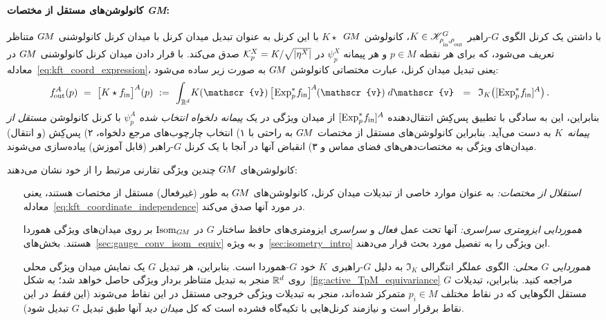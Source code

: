 \paragraph{کانولوشن‌های مستقل از مختصات \textit{GM}:}

با داشتن یک کرنل الگوی $G$-راهبر $K\in\KG$، کانولوشن $G\mkern-1.4muM$~$K\star$ با این کرنل به عنوان تبدیل میدان کرنل با میدان کرنل کانولوشنی $G\mkern-1.4muM$ متناظر تعریف می‌شود، که برای هر نقطه $p\in M$ و هر پیمانه $\psi_p^X$ در $\mathcal{K}_p^X = K / \sqrt{|\eta^X|}$ صدق می‌کند.
با قرار دادن میدان کرنل کانولوشنی $G\mkern-1.4muM$ در معادله~\eqref{eq:kft_coord_expression}، یعنی تبدیل میدان کرنل، عبارت مختصاتی کانولوشن $G\mkern-1.4muM$ به صورت زیر ساده می‌شود:
\begin{align}\label{eq:gauge_conv_coord_expression}
	\fout^A(p)
	\ =\ 
	\big[ K \star \fin \big]^A(p)
	\ :=&\,\ 
	\int_{\R^d} \!
	K(\mathscr{v}) \,
	\big[\mkern-2mu \Expspfin\big]^{\mkern-2mu A} \mkern-1mu(\mathscr{v})
	\; d\mathscr{v}
	\ \ =\,\ \mathfrak{I}_K \big( [\Expspfin]^A \big)
	\,.
\end{align}
بنابراین، این به سادگی با تطبیق پس‌کِش انتقال‌دهنده $[\operatorname{Exp}^*_p\mkern-2mu f_\textup{\;\!\!in}]^A$ از میدان ویژگی در یک \emph{پیمانه دلخواه انتخاب شده} $\psi_p^A$ با کرنل کانولوشن \emph{مستقل از پیمانه}~$K$ به دست می‌آید.
بنابراین کانولوشن‌های مستقل از مختصات $G\mkern-1.4muM$ به راحتی با
۱) انتخاب چارچوب‌های مرجع دلخواه،
۲) پس‌کِش (و انتقال) میدان‌های ویژگی به مختصات‌دهی‌های فضای مماس و
۳) انقباض آنها در آنجا با یک کرنل $G$-راهبر (قابل آموزش) پیاده‌سازی می‌شوند.

کانولوشن‌های $G\mkern-1.4muM$ چندین ویژگی تقارنی مرتبط را از خود نشان می‌دهند:
\begin{itemize}[leftmargin=13em]
	\item[\it استقلال از مختصات:]
	به عنوان موارد خاصی از تبدیلات میدان کرنل، کانولوشن‌های $G\mkern-1.4muM$ به طور (غیرفعال) مستقل از مختصات هستند، یعنی معادله~\eqref{eq:kft_coordinate_independence} در مورد آنها صدق می‌کند.
	\item[\it هموردایی ایزومتری سراسری:]
	آنها تحت عمل \emph{فعال} و \emph{سراسری} ایزومتری‌های حافظ ساختار $G$ در $\operatorname{Isom}_{G\mkern-1.4muM}$ بر روی میدان‌های ویژگی هموردا هستند.
	بخش‌های~\ref{sec:gauge_conv_isom_equiv} و به ویژه~\ref{sec:isometry_intro} این ویژگی را به تفصیل مورد بحث قرار می‌دهند.
	\item[\it هموردایی $G$ محلی:]
	الگوی عملگر انتگرالی $\mathfrak{I}_K$ به دلیل $G$-راهبری~$K$ خود $G$-هموردا است.
	بنابراین، هر تبدیل $G$ یک نمایش میدان ویژگی محلی روی $\mathbb{R}^d$ منجر به تبدیل متناظر بردار ویژگی حاصل خواهد شد؛ به شکل~\ref{fig:active_TpM_equivariance} مراجعه کنید.
	بنابراین، تبدیلات $G$ مستقل الگوهایی که در نقاط مختلف $p_i\in M$ متمرکز شده‌اند، منجر به تبدیلات ویژگی خروجی مستقل در این نقاط می‌شوند (این \emph{فقط} در این نقاط برقرار است و نیازمند کرنل‌هایی با تکیه‌گاه فشرده است که کل \emph{میدان دید} آنها طبق تبدیل $G$ تبدیل شود).
\end{itemize}

